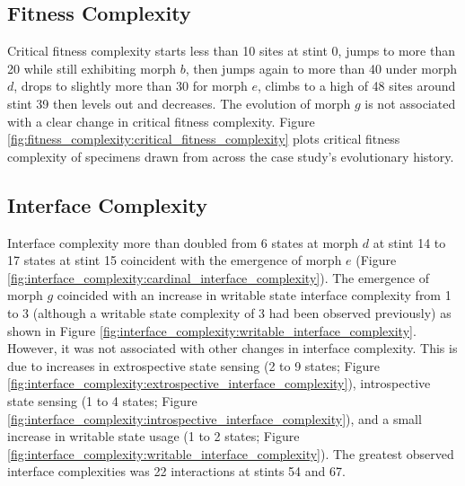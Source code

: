 \subsection{Fitness Complexity}



Critical fitness complexity starts less than 10 sites at stint 0, jumps to more than 20 while still exhibiting morph $b$, then jumps again to more than 40 under morph $d$, drops to slightly more than 30 for morph $e$, climbs to a high of 48 sites around stint 39 then levels out and decreases.
The evolution of morph $g$ is not associated with a clear change in critical fitness complexity.
Figure \ref{fig:fitness_complexity:critical_fitness_complexity} plots critical fitness complexity of specimens drawn from across the case study's evolutionary history.



\subsection{Interface Complexity}



Interface complexity more than doubled from 6 states at morph $d$ at stint 14 to 17 states at stint 15 coincident with the emergence of morph $e$ (Figure \ref{fig:interface_complexity:cardinal_interface_complexity}).
The emergence of morph $g$ coincided with an increase in writable state interface complexity from 1 to 3 (although a writable state complexity of 3 had been observed previously) as shown in Figure \ref{fig:interface_complexity:writable_interface_complexity}.
However, it was not associated with other changes in interface complexity.
This is due to increases in extrospective state sensing (2 to 9 states; Figure \ref{fig:interface_complexity:extrospective_interface_complexity}), introspective state sensing (1 to 4 states; Figure \ref{fig:interface_complexity:introspective_interface_complexity}), and a small increase in writable state usage (1 to 2 states; Figure \ref{fig:interface_complexity:writable_interface_complexity}).
The greatest observed interface complexities was 
22 interactions at stints 54 and 67.



